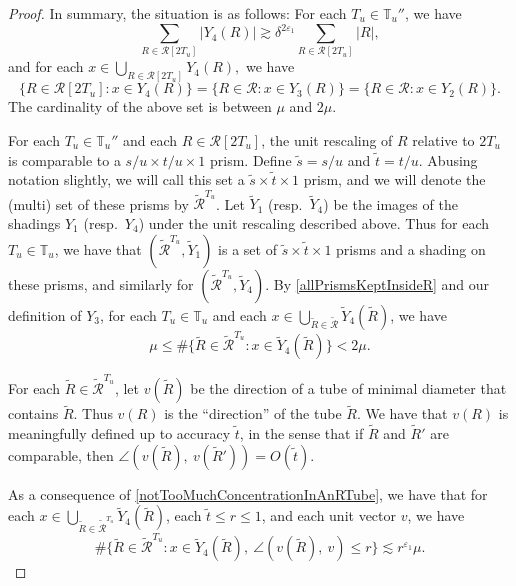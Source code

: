 \documentclass[letterpaper, reqno,11pt]{article}
\numberwithin{equation}{section}
\newcommand{\eps}{\varepsilon}
\newcommand{\tubes}{\mathbb{T}}
\numberwithin{thm}{section}
\theoremstyle{remark}
\begin{document}
\begin{proof}
In summary, the situation is as follows: For each $T_u\in\tubes_u''$, we have 
\begin{equation}\label{denseInsideR}
\sum_{R\in\mathcal{R}[2T_u]}|Y_4(R)|\gtrsim\delta^{2\eps_1}\sum_{R\in\mathcal{R}[2T_u]}|R|, 
\end{equation}
and for each $x\in\bigcup_{R\in\mathcal{R}[2T_u]}Y_4(R),$ we have
\begin{equation}\label{allPrismsKeptInsideR}
\{R\in\mathcal{R}[2T_u]\colon x\in Y_4(R)\}=\{R\in\mathcal{R}\colon x\in Y_3(R)\}=\{R\in\mathcal{R}\colon x\in Y_2(R)\}.
\end{equation}
The cardinality of the above set is between $\mu$ and $2\mu$.



For each $T_u\in\tubes_u''$ and each $R\in\mathcal{R}[2T_u]$, the unit rescaling of $R$ relative to $2T_u$ is comparable to a $s/u\times t/u\times 1$ prism. Define $\tilde s = s/u$ and $\tilde t = t/u$. Abusing notation slightly, we will call this set a $\tilde s\times\tilde t\times 1$ prism, and we will denote the (multi) set of these prisms by $\tilde{\mathcal{R}}^{T_u}$. Let $\tilde Y_1$ (resp.~$\tilde Y_4$) be the images of the shadings $Y_1$ (resp.~$Y_4$) under the unit rescaling described above. Thus for each $T_u\in\tubes_u$, we have that $(\tilde{\mathcal{R}}^{T_u},\tilde Y_1)$ is a set of $\tilde s\times\tilde t\times 1$ prisms and a shading on these prisms, and similarly for $(\tilde{\mathcal{R}}^{T_u},\tilde Y_4)$. By \eqref{allPrismsKeptInsideR} and our definition of $Y_3$, for each $T_u\in\tubes_u$ and each $x\in\bigcup_{\tilde R\in\tilde{\mathcal{R}}}\tilde Y_4(\tilde R)$, we have
\begin{equation}\label{rescaledMultiplicityBd}
\mu\leq \#\{\tilde R\in\tilde{\mathcal{R}}^{T_u}\colon x\in \tilde Y_4(\tilde R)\}<2\mu.
\end{equation}

For each $\tilde R\in\tilde{\mathcal{R}}^{T_u}$, let $v(\tilde R)$ be the direction of a tube of minimal diameter that contains $\tilde R$. Thus $v(R)$ is the ``direction'' of the tube $\tilde R$. We have that $v(R)$ is meaningfully defined up to accuracy $\tilde t$, in the sense that if $\tilde R$ and $\tilde R'$ are comparable, then $\angle(v(\tilde R),\ v(\tilde R')) = O(\tilde t)$. 

As a consequence of \eqref{notTooMuchConcentrationInAnRTube}, we have that for each $x\in\bigcup_{\tilde R\in\tilde{\mathcal{R}}^{T_u}}\tilde Y_4(\tilde R)$, each $\tilde t \leq r\leq 1$, and each unit vector $v$, we have
\begin{equation}\label{robustBroadnessRescaled}
\#\{\tilde R\in\tilde{\mathcal{R}}^{T_u}\colon x\in \tilde Y_4(\tilde R),\ \angle(v(\tilde R),\ v)\leq r\}\lesssim r^{\eps_1}\mu.
\end{equation}



\end{proof}
\end{document}

